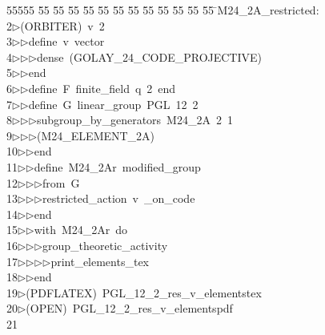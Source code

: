 %
%
\begin{tabbing}
55555 \= 55 \= 55 \= 55 \= 55 \= 55 \= 55 \= 55 \= 55 \= 55 \= 55 \= 55 \= 55 \= \>M24\_2A\_restricted:\\[0pt]
2\>$\triangleright$\>(ORBITER)\ v\ 2\ \\[0pt]
3\>$\triangleright$\>$\triangleright$\>define\ v\ vector\ \\[0pt]
4\>$\triangleright$\>$\triangleright$\>$\triangleright$\>dense\ (GOLAY\_24\_CODE\_PROJECTIVE)\ \\[0pt]
5\>$\triangleright$\>$\triangleright$\>end\ \\[0pt]
6\>$\triangleright$\>$\triangleright$\>define\ F\ finite\_field\ q\ 2\ end\ \\[0pt]
7\>$\triangleright$\>$\triangleright$\>define\ G\ linear\_group\ PGL\ 12\ 2\ \\[0pt]
8\>$\triangleright$\>$\triangleright$\>$\triangleright$\>subgroup\_by\_generators\ M24\_2A\ 2\ 1\ \\[0pt]
9\>$\triangleright$\>$\triangleright$\>$\triangleright$\>(M24\_ELEMENT\_2A)\ \\[0pt]
10\>$\triangleright$\>$\triangleright$\>end\ \\[0pt]
11\>$\triangleright$\>$\triangleright$\>define\ M24\_2Ar\ modified\_group\ \\[0pt]
12\>$\triangleright$\>$\triangleright$\>$\triangleright$\>from\ G\ \\[0pt]
13\>$\triangleright$\>$\triangleright$\>$\triangleright$\>restricted\_action\ v\ \_on\_code\ \\[0pt]
14\>$\triangleright$\>$\triangleright$\>end\ \\[0pt]
15\>$\triangleright$\>$\triangleright$\>with\ M24\_2Ar\ do\ \\[0pt]
16\>$\triangleright$\>$\triangleright$\>$\triangleright$\>group\_theoretic\_activity\ \\[0pt]
17\>$\triangleright$\>$\triangleright$\>$\triangleright$\>$\triangleright$\>print\_elements\_tex\ \ \\[0pt]
18\>$\triangleright$\>$\triangleright$\>end\\[0pt]
19\>$\triangleright$\>(PDFLATEX)\ PGL\_12\_2\_res\_v\_elementstex\\[0pt]
20\>$\triangleright$\>(OPEN)\ PGL\_12\_2\_res\_v\_elementspdf\\[0pt]
21\>\end{tabbing}
